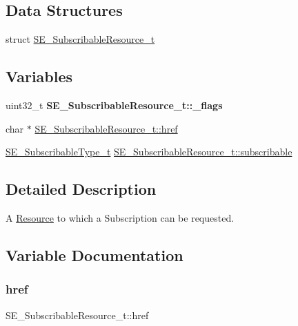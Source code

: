 \subsection*{Data Structures}
\begin{DoxyCompactItemize}
\item 
struct \hyperlink{structSE__SubscribableResource__t}{S\+E\+\_\+\+Subscribable\+Resource\+\_\+t}
\end{DoxyCompactItemize}
\subsection*{Variables}
\begin{DoxyCompactItemize}
\item 
\mbox{\label{group__SubscribableResource_gafdda63fab4c1552f3cb2b2ba27a9d84a}} 
uint32\+\_\+t {\bfseries S\+E\+\_\+\+Subscribable\+Resource\+\_\+t\+::\+\_\+flags}
\item 
char $\ast$ \hyperlink{group__SubscribableResource_ga441b3f58f676161e21090d41393461a0}{S\+E\+\_\+\+Subscribable\+Resource\+\_\+t\+::href}
\item 
\hyperlink{group__SubscribableType_ga5c41f553d369710ed34619266bf2551e}{S\+E\+\_\+\+Subscribable\+Type\+\_\+t} \hyperlink{group__SubscribableResource_gae36176e6f5160dca220b2e8047cdc241}{S\+E\+\_\+\+Subscribable\+Resource\+\_\+t\+::subscribable}
\end{DoxyCompactItemize}


\subsection{Detailed Description}
A \hyperlink{structResource}{Resource} to which a Subscription can be requested. 

\subsection{Variable Documentation}
\mbox{\label{group__SubscribableResource_ga441b3f58f676161e21090d41393461a0}} 
\subsubsection{\texorpdfstring{href}{href}}
{\footnotesize\ttfamily S\+E\+\_\+\+Subscribable\+Resource\+\_\+t\+::href}

